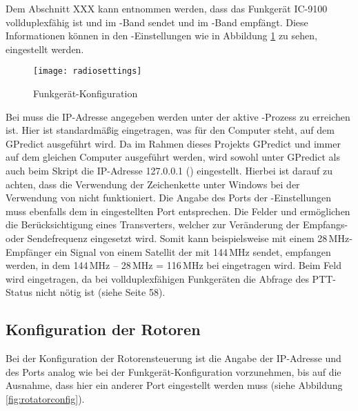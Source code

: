 Dem Abschnitt XXX kann entnommen werden, dass das Funkgerät IC-9100 vollduplexfähig ist und im -Band sendet und im -Band empfängt. Diese Informationen können in den -Einstellungen wie in Abbildung \ref{fig:radioconfig} zu sehen, eingestellt werden. 

\begin{figure}[h]
	\centering
	\texttt{[image: radiosettings]}
	\caption{Funkgerät-Konfiguration}
	\label{fig:radioconfig} 
\end{figure}

Bei  muss die IP-Adresse angegeben werden unter der aktive -Prozess zu erreichen ist. Hier ist standardmäßig  eingetragen, was für den Computer steht, auf dem GPredict ausgeführt wird. Da im Rahmen dieses Projekts GPredict und  immer auf dem gleichen Computer ausgeführt werden, wird sowohl unter GPredict als auch beim Skript  die IP-Adresse 127.0.0.1 () eingestellt. Hierbei ist darauf zu achten, dass die Verwendung der Zeichenkette  unter Windows bei der Verwendung von  nicht funktioniert. Die Angabe des Ports der -Einstellungen muss ebenfalls dem in  eingestellten Port entsprechen. Die Felder  und  ermöglichen die Berücksichtigung eines Transverters, welcher zur Veränderung der Empfangs- oder Sendefrequenz eingesetzt wird. Somit kann beispielsweise mit einem 28\,MHz-Empfänger ein Signal von einem Satellit der mit 144\,MHz sendet, empfangen werden, in dem 144\,MHz -- 28\,MHz = 116\,MHz bei  eingetragen wird. Beim Feld  wird  eingetragen, da bei vollduplexfähigen Funkgeräten die Abfrage des \ac{PTT}-Status nicht nötig ist (siehe \cite{gpredictmanual} Seite 58).

\clearpage

\subsection{Konfiguration der Rotoren}
\label{chap:rotatorconfig}	

Bei der Konfiguration der Rotorensteuerung ist die Angabe der IP-Adresse und des Ports analog wie bei der Funkgerät-Konfiguration vorzunehmen, bis auf die Ausnahme, dass hier ein anderer Port eingestellt werden muss (siehe Abbildung \ref{fig:rotatorconfig}). 

